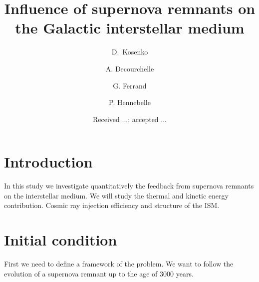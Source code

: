 \documentclass[referee,oldversion]{aa}
\begin{document}
\title{Influence of supernova remnants on the Galactic interstellar medium}

\author{D.~Kosenko \and A. Decourchelle \and G. Ferrand \and P. Hennebelle}

\date{Received ...; accepted ... }


\keywords{}

%

\section{Introduction}

In this study we investigate quantitatively the feedback from supernova remnants on the interstellar medium. We will study the thermal and kinetic energy contribution. Cosmic ray injection efficiency and structure of the ISM.


\section{Initial condition}

First we need to define a framework of the problem. We want to follow the evolution of a supernova remnant up to the age of 3000 years. 

\end{document}
